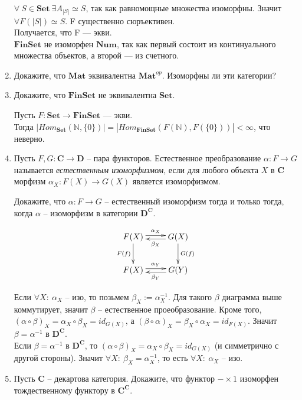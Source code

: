 \documentclass[draft]{article}
\newcommand{\cat}[1]{\mathbf{#1}}
\renewcommand{\C}{\cat{C}}
\newcommand{\D}{\cat{D}}
\newcommand{\Set}{\cat{Set}}
\newcommand{\FinSet}{\cat{FinSet}}
\newcommand{\Mat}{\cat{Mat}}
\newcommand{\Num}{\cat{Num}}
\begin{document}
\begin{enumerate}
$\forall ~S \in \Set ~\exists A_{|S|} \simeq S$, так как равномощные множества изоморфны. Значит $\forall F(|S|)\simeq S$. F существенно сюръективен.\\
Получается, что F --- экви.\\

$\FinSet$ не изоморфен $\Num$, так как первый состоит из континуального множества объектов, а второй --- из счетного.

\item Докажите, что $\Mat$ эквивалентна $\Mat^{op}$. Изоморфны ли эти категории?

\item Докажите, что $\FinSet$ не эквивалентна $\Set$.

Пусть $F: \Set \to \FinSet$ --- экви. \\
Тогда $|Hom_\Set(\mathbb{N}, \{0\})| = |Hom_\FinSet(F(\mathbb{N}), F(\{0\}))| < \infty$, что неверно. 

\item Пусть $F, G : \C \to \D$ -- пара функторов.
Естественное преобразование $\alpha : F \to G$ называется \emph{естественным изоморфизмом}, если для любого объекта $X$ в $\C$ морфизм $\alpha_X : F(X) \to G(X)$ является изоморфизмом.

Докажите, что $\alpha : F \to G$ -- естественный изоморфизм тогда и только тогда, когда $\alpha$ -- изоморфизм в категории $\D^\C$.

\[
\xymatrix{
	F(X) \ar@<+0.5ex>[r]^{\alpha_X} \ar[d]_{F(f)} & G(X) \ar@<+0.5ex>[l]^{\beta_X}\ar[d]^{G(f)}\\
	F(X) \ar@<+0.5ex>[r]^{\alpha_Y} & G(Y) \ar@<+0.5ex>[l]^{\beta_Y}
}
\]

Если $\forall X: ~\alpha_X$ -- изо, то позьмем $\beta_X := \alpha_X^{-1}$. Для такого $\beta$ диаграмма выше коммутирует, значит $\beta$ -- естественное проеобразование. Кроме того, $(\alpha \circ \beta)_X = \alpha_X \circ \beta_X = id_{G(X)}$, а $(\beta\circ \alpha )_X = \beta_X \circ \alpha_X = id_{F(X)}$. Значит $\beta = \alpha^{-1}$ в $\D^\C$.\\

Если $\beta = \alpha^{-1}$ в $\D^\C$, то $(\alpha \circ \beta)_X = \alpha_X \circ \beta_X = id_{G(X)}$ (и симметрично с другой стороны). Значит $\forall X:~ \beta_X = \alpha_X^{-1}$, то есть $\forall X: ~\alpha_X$ -- изо.


\item Пусть $\C$ -- декартова категория. Докажите, что функтор $- \times 1$ изоморфен тождественному функтору в $\C^\C$.


\end{enumerate}
\end{document}
